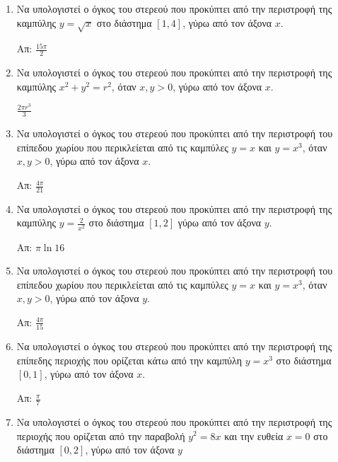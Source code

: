 


\everymath{\displaystyle}
\thispagestyle{empty}



\begin{center}
\end{center}

\vspace{\baselineskip}

\begin{enumerate}
  \item Να υπολογιστεί ο όγκος του στερεού που προκύπτει από την περιστροφή της καμπύλης $y=\sqrt{x}$ στο διάστημα $[1,4]$, γύρω από τον άξονα $x$.

  \hfill Απ: $\frac{15\pi}{2}$

  \item Να υπολογιστεί ο όγκος του στερεού που προκύπτει από την περιστροφή της καμπύλης $x^{2}+y^{2}=r^{2}$, όταν $x,y>0$, γύρω από τον άξονα $x$.

  \hfill $\frac{2\pi r^{3}}{3}$

  \item  Να υπολογιστεί ο όγκος του στερεού που προκύπτει από την περιστροφή του επίπεδου χωρίου που περικλείεται από τις καμπύλες $y=x$ και $y=x^{3}$, όταν $x,y>0$, γύρω από τον άξονα $x$.

  \hfill Απ: $\frac{4\pi}{21}$


  \item  Να υπολογιστεί ο όγκος του στερεού που προκύπτει από την περιστροφή της καμπύλης $y=\frac{2}{x^{2}}$ στο διάστημα $[1,2]$ γύρω από τον άξονα $y$.

  \hfill Απ: $\pi\ln 16$

  \item  Να υπολογιστεί ο όγκος του στερεού που προκύπτει από την περιστροφή του επίπεδου χωρίου που περικλείεται από τις καμπύλες $y=x$ και $y=x^{3}$, όταν $x,y>0$, γύρω από τον άξονα $y$.

  \hfill Απ: $\frac{4\pi}{15}$

   \item Να υπολογιστεί ο όγκος του στερεού που προκύπτει από την περιστροφή της επίπεδης περιοχής που ορίζεται κάτω από την καμπύλη $y=x^{3}$ στο διάστημα $[0,1]$, γύρω από τον άξονα $x$.

   \hfill Απ: $\frac{\pi}{7}$

   \item  Να υπολογιστεί ο όγκος του στερεού που προκύπτει από την περιστροφή της περιοχής που ορίζεται από την παραβολή $y^{2}=8x$ και την ευθεία $x=0$ στο διάστημα $[0,2]$, γύρω από τον άξονα $y$


\end{enumerate}
